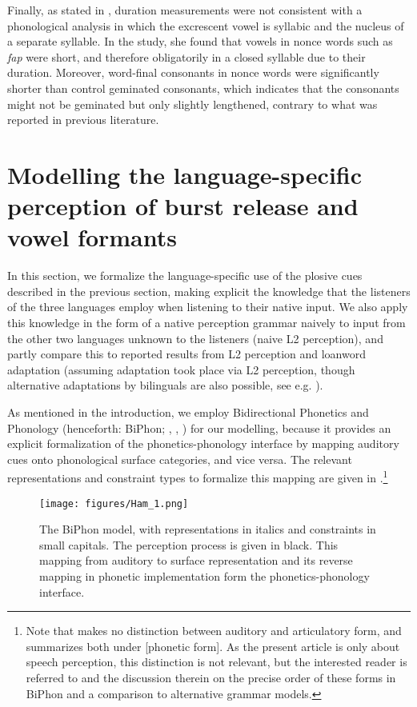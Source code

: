 \documentclass[output=paper,colorlinks,citecolor=brown]{langscibook}
\begin{document}
Finally, as stated in \citet{Miatto2022}, duration measurements were not consistent with a phonological analysis in which the excrescent vowel is syllabic and the nucleus of a separate syllable. In the study, she found that vowels in nonce words such as \textit{fap} were short, and therefore obligatorily in a closed syllable due to their duration. Moreover, word-final consonants in nonce words were significantly shorter than control geminated consonants, which indicates that the consonants might not be geminated but only slightly lengthened, contrary to what was reported in previous literature. 


\section{Modelling the language-specific perception of burst release and vowel formants} \label{hamann:3_model}

In this section, we formalize the language-specific use of the plosive cues described in the previous section, making explicit the knowledge that the listeners of the three languages employ when listening to their native input. We also apply this knowledge in the form of a native perception grammar naively to input from the other two languages unknown to the listeners (naive L2 perception), and partly compare this to reported results from L2 perception and loanword adaptation (assuming adaptation took place via L2 perception, though alternative adaptations by bilinguals are also possible, see e.g. \cite{ParadisLaCharité1997}).


As mentioned in the introduction, we employ Bidirectional Phonetics and Phonology (henceforth: BiPhon; \cite{Boersma2007}, \citeyear{Boersma2011},  \cite{BoersmaHamann2009}) for our modelling, because it provides an explicit formalization of the phonetics-phonology interface by mapping auditory cues onto phonological surface categories, and vice versa. The relevant representations and constraint types to formalize this mapping are given in .\footnote{Note that  makes no distinction between auditory and articulatory form, and summarizes both under [phonetic form]. As the present article is only about speech perception, this distinction is not relevant, but the interested reader is referred to \citet{Hamann2011} and the discussion therein on the precise order of these forms in BiPhon and a comparison to alternative grammar models.}


\begin{figure}[h]
\caption{The BiPhon model, with representations in italics and constraints in small capitals. The perception process is given in black. This mapping from auditory to surface representation and its reverse mapping in phonetic implementation form the phonetics-phonology interface.}
\texttt{[image: figures/Ham\_1.png]}
\label{hamann:biph}
\end{figure}
\end{document}
